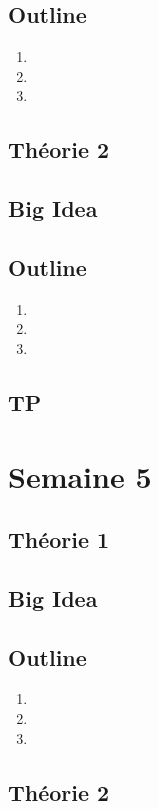\documentclass{article}
\begin{document}
\subsection*{Outline}
    \begin{enumerate}
    \item
    \item
    \item
    \end{enumerate}
\subsection{Théorie 2}
\subsection*{Big Idea}
\subsection*{Outline}
    \begin{enumerate}
    \item
    \item
    \item
    \end{enumerate}
\subsection{TP}

\pagebreak
\section{Semaine 5}
\subsection{Théorie 1}
\subsection*{Big Idea}
\subsection*{Outline}
    \begin{enumerate}
    \item
    \item
    \item
    \end{enumerate}
\subsection{Théorie 2}
\end{document}
